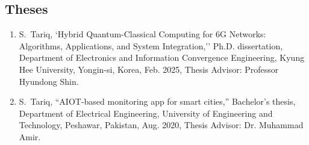 \documentclass[10pt]{article}
\begin{document}






\subsection*{Theses}

\begin{enumerate}

\item

S.~Tariq, `Hybrid Quantum-Classical Computing
for 6G Networks: Algorithms,
Applications, and System Integration,'' Ph.D. dissertation, Department of Electronics and Information Convergence Engineering, Kyung Hee University, Yongin-si, Korea, Feb. 2025, Thesis
  Advisor: Professor Hyundong Shin.

\item

S.~Tariq, ``AIOT-based monitoring app for smart cities,'' Bachelor's thesis, Department of Electrical Engineering, University of Engineering and Technology, Peshawar, Pakistan, Aug. 2020, Thesis
  Advisor:  Dr. Muhammad Amir.

\end{enumerate}


\end{document}
